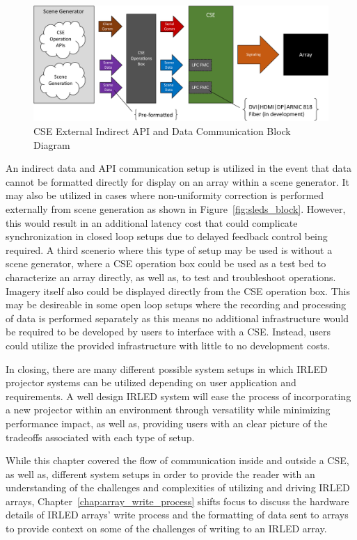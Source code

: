     \begin{figure}
        \centering
        \includegraphics[width=1.0\textwidth]{fig/external_cse_comm_indirect.pdf}
        \caption{CSE External Indirect API and Data Communication Block Diagram}
        \label{fig:external_cse_comm_indirect}
    \end{figure}

    An indirect data and API communication setup is utilized in the event that data cannot be formatted directly for display on an array within a scene generator. It may also be utilized in cases where non-uniformity correction is performed externally from scene generation as shown in Figure~\ref{fig:sleds_block}. However, this would result in an additional latency cost that could complicate synchronization in closed loop setups due to delayed feedback control being required. A third scenerio where this type of setup may be used is without a scene generator, where a CSE operation box could be used as a test bed to characterize an array directly, as well as, to test and troubleshoot operations. Imagery itself also could be displayed directly from the CSE operation box. This may be desireable in some open loop setups where the recording and processing of data is performed separately as this means no additional infrastructure would be required to be developed by users to interface with a CSE. Instead, users could utilize the provided infrastructure with little to no development costs.

    In closing, there are many different possible system setups in which IRLED projector systems can be utilized depending on user application and requirements. A well design IRLED system will ease the process of incorporating a new projector within an environment through versatility while minimizing performance impact, as well as, providing users with an clear picture of the tradeoffs associated with each type of setup.

    While this chapter covered the flow of communication inside and outside a CSE, as well as, different system setups in order to provide the reader with an understanding of the challenges and complexities of utilizing and driving IRLED arrays, Chapter~\ref{chap:array_write_process} shifts focus to discuss the hardware details of IRLED arrays' write process and the formatting of data sent to arrays to provide context on some of the challenges of writing to an IRLED array.
